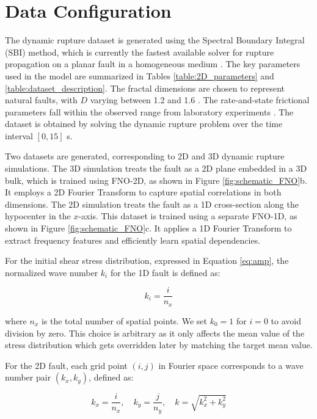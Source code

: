 \documentclass[draft]{agujournal2019}
\begin{document}
\section{Data Configuration}
\label{sec:data}

The dynamic rupture dataset is generated using the Spectral Boundary Integral (SBI) method, which is currently the fastest available solver for rupture propagation on a planar fault in a homogeneous medium \cite{geubelle1995spectral,kammer2021uguca}.  The key parameters used in the model are summarized in Tables \ref{table:2D_parameters} and \ref{table:dataset_description}. The fractal dimensions are chosen to represent natural faults, with \( D \) varying between 1.2 and 1.6 \cite{renard2017scaling}. The rate-and-state frictional parameters fall within the observed range from laboratory experiments \cite{ikari2011relation}. The dataset is obtained by solving the dynamic rupture problem over the time interval \( [0,15] \) s. 

Two datasets are generated, corresponding to 2D and 3D dynamic rupture simulations. The 3D simulation treats the fault as a 2D plane embedded in a 3D bulk, which is trained using FNO-2D, as shown in Figure \ref{fig:schematic_FNO}b. It employs a 2D Fourier Transform to capture spatial correlations in both dimensions. The 2D simulation treats the fault as a 1D cross-section along the hypocenter in the \( x \)-axis. This dataset is trained using a separate FNO-1D, as shown in Figure \ref{fig:schematic_FNO}c. It applies a 1D Fourier Transform to extract frequency features and efficiently learn spatial dependencies. 

For the initial shear stress distribution, expressed in Equation \ref{eq:amp}, the normalized wave number \( k_i \) for the 1D fault is defined as:

\begin{equation}
\label{eqn:k_2D}
k_i = \frac{i}{n_x}
\end{equation}

where \( n_x \) is the total number of spatial points. We set \( k_0 = 1 \) for \( i = 0 \) to avoid division by zero. This choice is arbitrary as it only affects the mean value of the stress distribution which gets overridden later by matching the target mean value.

For the 2D fault, each grid point \( (i,j) \) in Fourier space corresponds to a wave number pair \( (k_x, k_y) \), defined as:

\begin{equation}
\label{eqn:k_3D}
k_x = \frac{i}{n_x}, \quad k_y = \frac{j}{n_y}, \quad
k = \sqrt{k_x^2 + k_y^2}
\end{equation}
\end{document}
